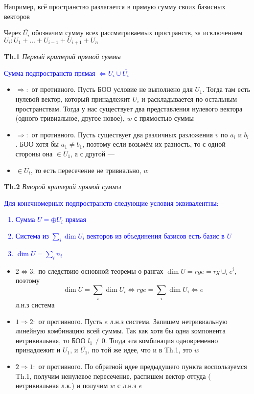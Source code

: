 Например, всё пространство разлагается в прямую сумму своих базисных векторов

Через $\overline{U_i}$ обозначим сумму всех рассматриваемых пространств, за исключением $U_i: U_1 + \dots + U_{i-1} +
U_{i+1} + U_n$

\textbf{Th.1} \textit{Первый критерий прямой суммы}

\textcolor{blue}{Сумма подпространств прямая $\Leftrightarrow U_i \cup \overline{U_i}$}

\begin{itemize}
    \item $\Rightarrow:$ от противного.
    Пусть БОО условие не выполнено для $U_1$.
    Тогда там есть нулевой вектор, который принадлежит $U_i$ и раскладывается по остальным пространствам.
    Тогда у нас существует два представления нулевого вектора (одного тривиальное, другое новое), $w$ с прямостью суммы
    \item $\Rightarrow:$ от противного.
    Пусть существует два различных разложения $v$ по $a_i$ и $b_i$.
    БОО хотя бы $a_1 \neq b_1$, поэтому если возьмём их разность, то с одной стороны она $\in U_1$, а с другой ---
    \item $\in \overline{U_i}$, то есть пересечение не тривиально, $w$
\end{itemize}

\textbf{Th.2} \textit{Второй критерий прямой суммы}

\textcolor{blue}{Для конечномерных подпространств следующие условия эквивалентны:
    \begin{enumerate}
        \item Сумма $U = \oplus U_i$ прямая
        \item Система из $\sum_i \dim U_i$ векторов из объединения базисов есть базис в $U$
        \item $\dim U = \sum_i n_i$
    \end{enumerate} }

\begin{itemize}
    \item $2 \Leftrightarrow 3:$ по следствию основной теоремы о рангах $\dim U = rg e = rg \cup_i e^i$, поэтому
    \[ \dim U = \sum_i \dim U_i \Leftrightarrow rg e = \sum_i \dim U_i \Leftrightarrow e \] л.н.з система
    \item $1 \Rightarrow 2:$ от противного.
    Пусть $e$ л.н.з система.
    Запишем нетривиальную линейную комбинацию всей суммы.
    Так как хотя бы одна компонента нетривиальная, то БОО $l_1 \neq 0$.
    Тогда эта комбинация одновременно принадлежит и $U_1$, и $\overline{U_1}$, по той же идее, что и в Th.1, это $w$
    \item $2 \Rightarrow 1:$ от противного.
    По обратной идее предыдущего пункта воспользуемся Th.1, получим ненулевое пересечение, распишем вектор оттуда (
    нетривиальная л.к.) и получим $w$ с л.н.з $e$
\end{itemize}

